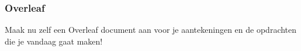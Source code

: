 \begin{frame}
    \frametitle{Overleaf}
    \Large
    Maak nu zelf een Overleaf document aan voor je aantekeningen en de opdrachten die je vandaag gaat maken!
\end{frame}